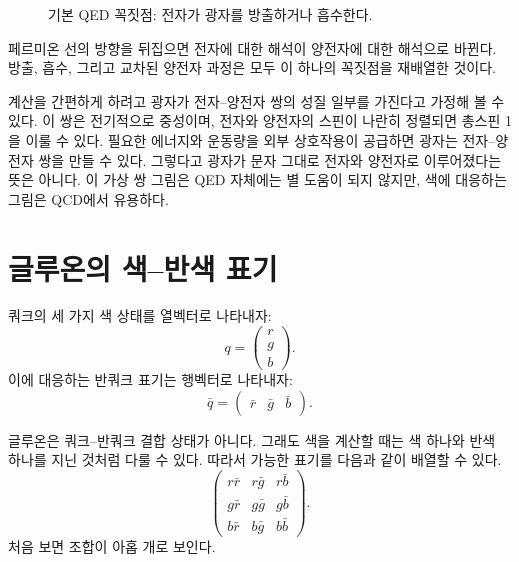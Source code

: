 \begin{figure}[h]
\centering
{}
\caption{기본 QED 꼭짓점: 전자가 광자를 방출하거나 흡수한다.}
\end{figure}

페르미온 선의 방향을 뒤집으면 전자에 대한 해석이 양전자에 대한 해석으로 바뀐다. 방출, 흡수, 그리고 교차된 양전자 과정은 모두 이 하나의 꼭짓점을 재배열한 것이다.

계산을 간편하게 하려고 광자가 전자--양전자 쌍의 성질 일부를 가진다고 가정해 볼 수 있다. 이 쌍은 전기적으로 중성이며, 전자와 양전자의 스핀이 나란히 정렬되면 총스핀 1을 이룰 수 있다. 필요한 에너지와 운동량을 외부 상호작용이 공급하면 광자는 전자--양전자 쌍을 만들 수 있다. 그렇다고 광자가 문자 그대로 전자와 양전자로 이루어졌다는 뜻은 아니다. 이 가상 쌍 그림은 QED 자체에는 별 도움이 되지 않지만, 색에 대응하는 그림은 QCD에서 유용하다.

\section{글루온의 색--반색 표기}

쿼크의 세 가지 색 상태를 열벡터로 나타내자:
\begin{equation}
q=
\begin{pmatrix}
r\\
g\\
b
\end{pmatrix}.
\end{equation}
이에 대응하는 반쿼크 표기는 행벡터로 나타내자:
\begin{equation}
\bar q=
\begin{pmatrix}
\bar r&\bar g&\bar b
\end{pmatrix}.
\end{equation}

글루온은 쿼크--반쿼크 결합 상태가 아니다. 그래도 색을 계산할 때는 색 하나와 반색 하나를 지닌 것처럼 다룰 수 있다. 따라서 가능한 표기를 다음과 같이 배열할 수 있다.
\begin{equation}
\begin{pmatrix}
r\bar r&r\bar g&r\bar b\\
g\bar r&g\bar g&g\bar b\\
b\bar r&b\bar g&b\bar b
\end{pmatrix}.
\end{equation}
처음 보면 조합이 아홉 개로 보인다.

